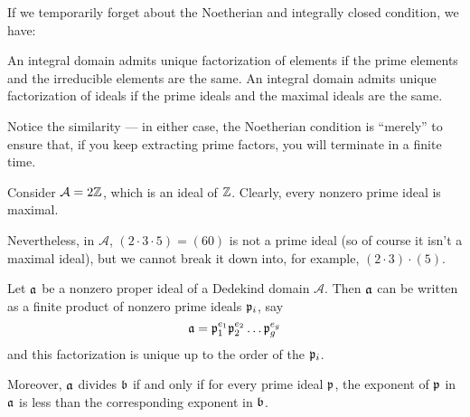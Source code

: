 \begin{remark}
	If we temporarily forget about the Noetherian and integrally closed condition, we have:
	\begin{itemize}
		\ii An integral domain admits unique factorization of elements if the prime elements and the irreducible elements are the same.
		\ii An integral domain admits unique factorization of ideals if the prime ideals and the maximal ideals are the same.
	\end{itemize}
	Notice the similarity --- in either case, the Noetherian condition is ``merely'' to ensure that, if you keep extracting prime factors, you will terminate in a finite time.
\end{remark}

\begin{example}
	Consider $\mathcal A = 2\mathbb Z$, which is an ideal of $\mathbb Z$.
	Clearly, every nonzero prime ideal is maximal.

	Nevertheless, in $\mathcal A$,
	$(2 \cdot 3 \cdot 5)=(60)$ is not a prime ideal (so of course it isn't a maximal ideal),
	but we cannot break it down into, for example, $(2 \cdot 3) \cdot (5)$.
\end{example}

\begin{theorem}
	Let $\mathfrak a$ be a nonzero proper ideal of a Dedekind domain $\mathcal A$.
	Then $\mathfrak a$ can be written as a finite product of nonzero prime ideals $\mathfrak p_i$, say
	\[ \mathfrak a = \mathfrak p_1^{e_1} \mathfrak p_2^{e_2} \dots \mathfrak p_g^{e_g} \]
	and this factorization is unique up to the order of the $\mathfrak p_i$.

	Moreover, $\mathfrak a$ divides $\mathfrak b$ if and only if for every prime ideal $\mathfrak p$,
	the exponent of $\mathfrak p$ in $\mathfrak a$ is less than the corresponding exponent in $\mathfrak b$.
\end{theorem}

